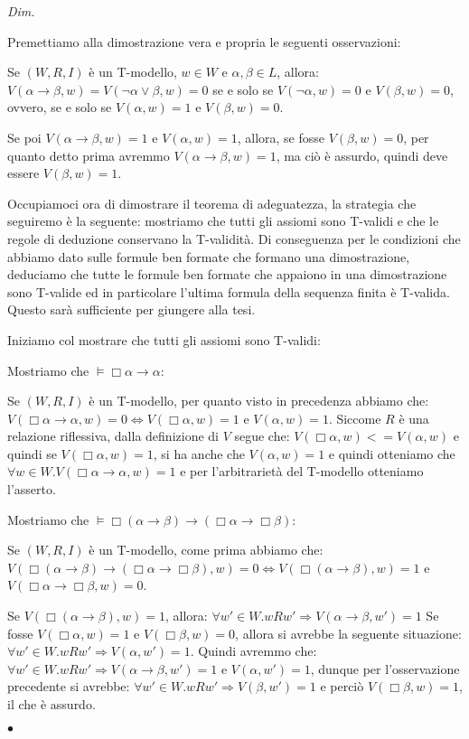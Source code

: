 \documentclass[a4paper, titlepage, 12pt]{report}
\newenvironment{proof}
    {\textit{Dim.}
    }
    {\begin{flushright}$\bullet$\end{flushright}
    }
\begin{document}
\begin{proof}

Premettiamo alla dimostrazione vera e propria le seguenti osservazioni:

Se $(W, R, I)$ è un T-modello, $w \in W$ e $\alpha, \beta \in L$, allora:
$V(\alpha \rightarrow \beta, w) = V(\neg \alpha \lor \beta, w) = 0$ se e solo se
$V(\neg \alpha, w) = 0$ e $V(\beta, w) = 0$, ovvero, se e solo se $V(\alpha, w) = 1$ e $V(\beta, w) = 0$.

Se poi $V(\alpha \rightarrow \beta, w) = 1$ e $V(\alpha, w) = 1$, allora, se fosse
$V(\beta, w) = 0$, per quanto detto prima avremmo $V(\alpha \rightarrow \beta, w) = 1$, ma ciò
è assurdo, quindi deve essere $V(\beta, w) = 1$.

Occupiamoci ora di dimostrare il teorema di adeguatezza, la strategia che seguiremo è la seguente:
mostriamo che tutti gli assiomi sono T-validi e che le regole di deduzione conservano la T-validità.
Di conseguenza per le condizioni che abbiamo dato sulle formule ben formate che formano una dimostrazione,
deduciamo che tutte le formule ben formate che appaiono in una dimostrazione sono T-valide
ed in particolare l'ultima formula della sequenza finita è T-valida.
Questo sarà sufficiente per giungere alla tesi.

Iniziamo col mostrare che tutti gli assiomi sono T-validi:

Mostriamo che $\vDash \Box \alpha \rightarrow \alpha$:

Se $(W, R, I)$ è un T-modello, per quanto visto in precedenza abbiamo che:
$V(\Box \alpha \rightarrow \alpha, w) = 0 \Leftrightarrow V(\Box \alpha, w) = 1$ e $V(\alpha, w) = 1$.
Siccome $R$ è una relazione riflessiva, dalla definizione di $V$ segue che:
$V(\Box \alpha, w) <= V(\alpha, w)$ e quindi se $V(\Box \alpha, w) = 1$, si ha anche che
$V(\alpha, w) = 1$ e quindi otteniamo che
$\forall w \in W. V(\Box \alpha \rightarrow \alpha, w) = 1$ e per l'arbitrarietà
del T-modello otteniamo l'asserto.

Mostriamo che $\vDash \Box (\alpha \rightarrow \beta) \rightarrow (\Box \alpha \rightarrow \Box \beta)$:

Se $(W, R, I)$ è un T-modello, come prima abbiamo che:
$V(\Box (\alpha \rightarrow \beta) \rightarrow (\Box \alpha \rightarrow \Box \beta), w) = 0
\Leftrightarrow V(\Box (\alpha \rightarrow \beta), w) = 1$ e $V(\Box \alpha \rightarrow \Box \beta, w) = 0$.

Se $V(\Box(\alpha \rightarrow \beta), w) = 1$, allora: $\forall w' \in W. wRw' \Rightarrow V(\alpha \rightarrow \beta, w') = 1$
Se fosse $V(\Box \alpha, w) = 1$ e $V(\Box \beta, w) = 0$, allora si avrebbe la seguente
situazione: $\forall w' \in W. wRw' \Rightarrow V(\alpha, w') = 1$. Quindi avremmo che:
$\forall w' \in W. wRw' \Rightarrow V(\alpha \rightarrow \beta, w') = 1$ e $V(\alpha, w') = 1$,
dunque per l'osservazione precedente si avrebbe: $\forall w' \in W. wRw' \Rightarrow V(\beta, w') = 1$
e perciò $V(\Box \beta, w) = 1$, il che è assurdo.


\end{proof}
\end{document}
